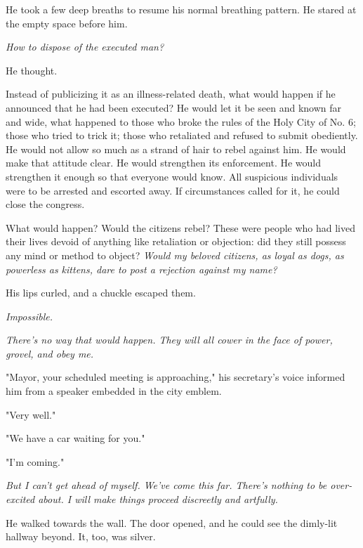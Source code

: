He took a few deep breaths to resume his normal breathing pattern. He
stared at the empty space before him.

\emph{How to dispose of the executed man?}

He thought.

Instead of publicizing it as an illness-related death, what would happen
if he announced that he had been executed? He would let it be seen and
known far and wide, what happened to those who broke the rules of the
Holy City of No. 6; those who tried to trick it; those who retaliated
and refused to submit obediently. He would not allow so much as a strand
of hair to rebel against him. He would make that attitude clear. He
would strengthen its enforcement. He would strengthen it enough so that
everyone would know. All suspicious individuals were to be arrested and
escorted away. If circumstances called for it, he could close the
congress.

What would happen? Would the citizens rebel? These were people who had
lived their lives devoid of anything like retaliation or objection: did
they still possess any mind or method to object? \emph{Would my beloved
citizens, as loyal as dogs, as powerless as kittens, dare to post a
rejection against my name?}

His lips curled, and a chuckle escaped them.

\emph{Impossible.}

\emph{There's no way that would happen. They will all cower in the face of
power, grovel, and obey me.}

"Mayor, your scheduled meeting is approaching," his secretary's voice
informed him from a speaker embedded in the city emblem.

"Very well."

"We have a car waiting for you."

"I'm coming."

\emph{But I can't get ahead of myself. We've come this far. There's nothing to
be over-excited about. I will make things proceed discreetly and
artfully.}

He walked towards the wall. The door opened, and he could see the
dimly-lit hallway beyond. It, too, was silver.